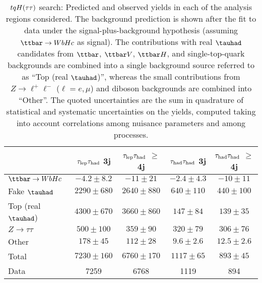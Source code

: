 \begin{table}[htbp]
\small
\begin{center}
\begin{tabular}{l*{4}{c}}
\hline\hline
 & $\tau_{\mathrm{lep}} \tau_{\mathrm{had}}$ 3j & $\tau_{\mathrm{lep}} \tau_{\mathrm{had}}$ $\geq$4j & $\tau_{\mathrm{had}} \tau_{\mathrm{had}}$ 3j &  $\tau_{\mathrm{had}} \tau_{\mathrm{had}}$ $\geq$4j \\
\hline
$\Hc$  &   $ -4.2 \pm 8.2 $ &   $ -11 \pm 21 $ &   $ -2.4 \pm 4.3 $ &   $ -10 \pm 11 $ \\ 
\hline
Fake $\tauhad$  &   $ 2290 \pm 680 $ &   $ 2640 \pm 880 $ &   $ 640 \pm 110 $ &   $ 440 \pm 100 $ \\ 
Top (real $\tauhad$)  &   $ 4300 \pm 670 $ &   $ 3660 \pm 860 $ &   $ 147 \pm 84 $ &   $ 139 \pm 35 $ \\ 
$Z \to \tau\tau$  &   $ 500 \pm 100 $ &   $ 359 \pm 90 $ &   $ 320 \pm 79 $ &   $ 306 \pm 76 $ \\ 
Other  &   $ 178 \pm 45 $ &   $ 112 \pm 28 $ &   $ 9.6 \pm 2.6 $ &   $ 12.5 \pm 2.6 $ \\ 
\hline
Total  &   $ 7230 \pm 160 $ &   $ 6760 \pm 170 $ &   $ 1117 \pm 65 $ &   $ 893 \pm 45 $ \\
\hline
Data & 7259  & 6768  & 1119  & 894 \\ 
\hline\hline    
\end{tabular}

%
\end{center}
\caption{
$tqH(\tau\tau)$ search: Predicted and observed yields in each of the analysis regions considered.
The background prediction is shown after the fit to data under the signal-plus-background hypothesis 
(assuming $\Hc$ as signal).
The contributions with real $\tauhad$ candidates from $\ttbar$,  $\ttbar V$, $\ttbar H$, and single-top-quark backgrounds are combined into
a single background source referred to as ``Top (real $\tauhad$)'', whereas the small contributions from 
$Z\to \ell^+\ell^-$ ($\ell = e, \mu$) and diboson backgrounds are combined into ``Other''. 
The quoted uncertainties are the sum in quadrature of statistical and systematic uncertainties on the yields, 
computed taking into account correlations among nuisance parameters and among processes.
}
\label{tab:Htautau_Postfit_Yields_Unblind_Hc}
\end{table} 

